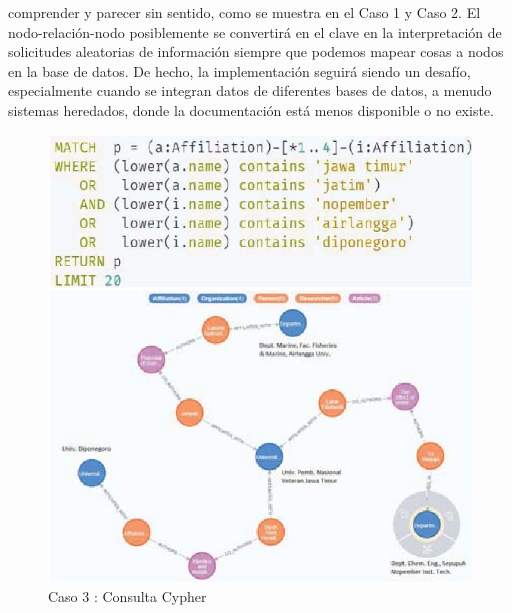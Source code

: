comprender y parecer sin sentido, como se muestra en el Caso 1 y
Caso 2. El nodo-relación-nodo posiblemente se convertirá en el
clave en la interpretación de solicitudes aleatorias de información siempre que
podemos mapear cosas a nodos en la base de datos. De hecho, la implementación seguirá siendo un desafío, especialmente cuando se integran datos de diferentes bases de datos, a menudo sistemas heredados, donde la documentación está menos disponible o no existe.
\begin{figure}[H]
    \centering
    \includegraphics[scale=0.8]{Graficos/neo33.png}
    \caption{Caso 3 : Consulta Cypher}
    \label{fig:neo3}
    \end{figure}
